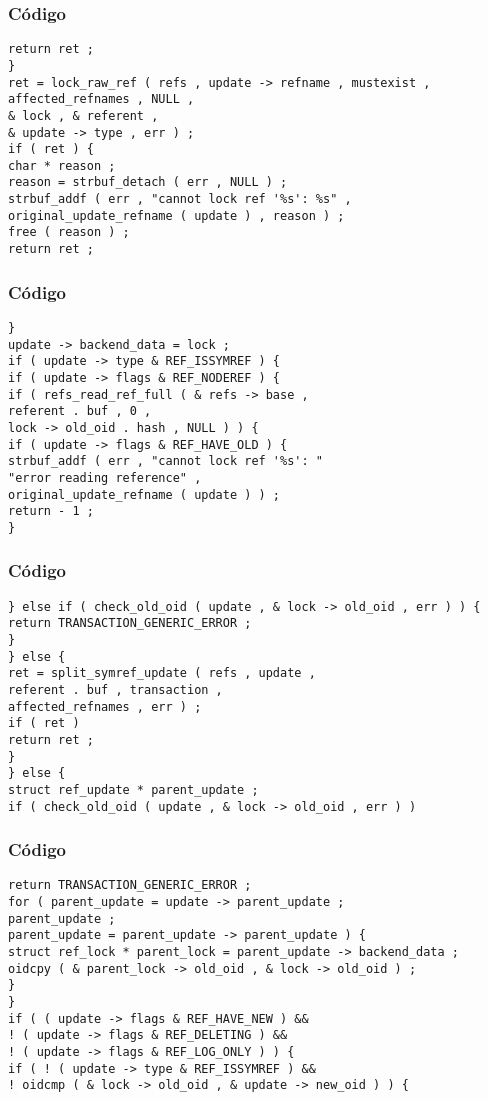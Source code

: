 \documentclass{beamer}
\begin{document}
\begin{frame}[fragile]
\frametitle{C\'odigo}
\begin{verbatim}
return ret ; 
} 
ret = lock_raw_ref ( refs , update -> refname , mustexist , 
affected_refnames , NULL , 
& lock , & referent , 
& update -> type , err ) ; 
if ( ret ) { 
char * reason ; 
reason = strbuf_detach ( err , NULL ) ; 
strbuf_addf ( err , "cannot lock ref '%s': %s" , 
original_update_refname ( update ) , reason ) ; 
free ( reason ) ; 
return ret ; 
\end{verbatim}
\end{frame}
\begin{frame}[fragile]
\frametitle{C\'odigo}
\begin{verbatim}
} 
update -> backend_data = lock ; 
if ( update -> type & REF_ISSYMREF ) { 
if ( update -> flags & REF_NODEREF ) { 
if ( refs_read_ref_full ( & refs -> base , 
referent . buf , 0 , 
lock -> old_oid . hash , NULL ) ) { 
if ( update -> flags & REF_HAVE_OLD ) { 
strbuf_addf ( err , "cannot lock ref '%s': " 
"error reading reference" , 
original_update_refname ( update ) ) ; 
return - 1 ; 
} 
\end{verbatim}
\end{frame}
\begin{frame}[fragile]
\frametitle{C\'odigo}
\begin{verbatim}
} else if ( check_old_oid ( update , & lock -> old_oid , err ) ) { 
return TRANSACTION_GENERIC_ERROR ; 
} 
} else { 
ret = split_symref_update ( refs , update , 
referent . buf , transaction , 
affected_refnames , err ) ; 
if ( ret ) 
return ret ; 
} 
} else { 
struct ref_update * parent_update ; 
if ( check_old_oid ( update , & lock -> old_oid , err ) ) 
\end{verbatim}
\end{frame}
\begin{frame}[fragile]
\frametitle{C\'odigo}
\begin{verbatim}
return TRANSACTION_GENERIC_ERROR ; 
for ( parent_update = update -> parent_update ; 
parent_update ; 
parent_update = parent_update -> parent_update ) { 
struct ref_lock * parent_lock = parent_update -> backend_data ; 
oidcpy ( & parent_lock -> old_oid , & lock -> old_oid ) ; 
} 
} 
if ( ( update -> flags & REF_HAVE_NEW ) && 
! ( update -> flags & REF_DELETING ) && 
! ( update -> flags & REF_LOG_ONLY ) ) { 
if ( ! ( update -> type & REF_ISSYMREF ) && 
! oidcmp ( & lock -> old_oid , & update -> new_oid ) ) { 
\end{verbatim}
\end{frame}
\end{document}
